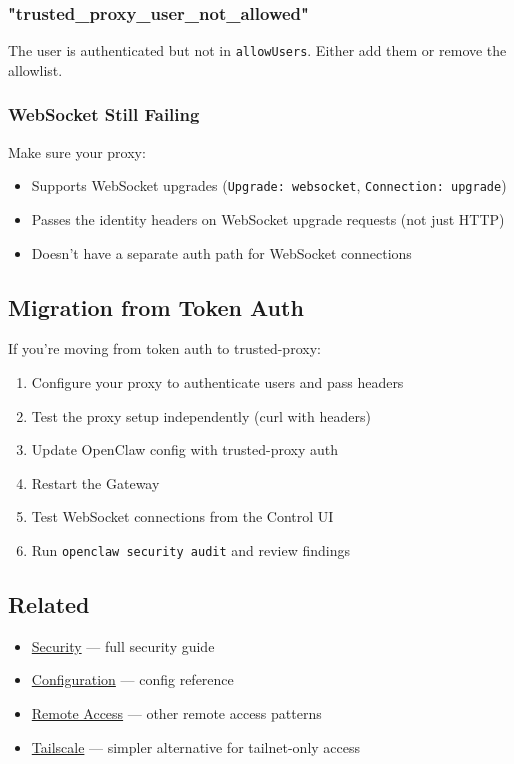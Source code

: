 \subsubsection{"trusted\_proxy\_user\_not\_allowed"}


The user is authenticated but not in \texttt{allowUsers}. Either add them or remove the allowlist.

\subsubsection{WebSocket Still Failing}


Make sure your proxy:

\begin{itemize}
  \item Supports WebSocket upgrades (\texttt{Upgrade: websocket}, \texttt{Connection: upgrade})
  \item Passes the identity headers on WebSocket upgrade requests (not just HTTP)
  \item Doesn't have a separate auth path for WebSocket connections
\end{itemize}


\subsection{Migration from Token Auth}


If you're moving from token auth to trusted-proxy:

\begin{enumerate}
  \item Configure your proxy to authenticate users and pass headers
  \item Test the proxy setup independently (curl with headers)
  \item Update OpenClaw config with trusted-proxy auth
  \item Restart the Gateway
  \item Test WebSocket connections from the Control UI
  \item Run \texttt{openclaw security audit} and review findings
\end{enumerate}


\subsection{Related}


\begin{itemize}
  \item \href{/gateway/security}{Security} — full security guide
  \item \href{/gateway/configuration}{Configuration} — config reference
  \item \href{/gateway/remote}{Remote Access} — other remote access patterns
  \item \href{/gateway/tailscale}{Tailscale} — simpler alternative for tailnet-only access
\end{itemize}



\clearpage
